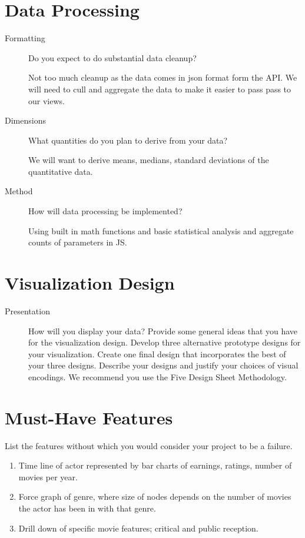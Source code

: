 \documentclass[12pt]{article}
\begin{document}
\section{Data Processing}
\begin{description}
    
    \item [Formatting] Do you expect to do substantial data cleanup?
        
        Not too much cleanup as the data comes in json format form the API. We will need to cull and aggregate the data to make it easier to pass pass to our views. 

    \item [Dimensions] What quantities do you plan to derive from your data?

        We will want to derive means, medians, standard deviations of the quantitative data.

    \item [Method] How will data processing be implemented?

        Using built in math functions and basic statistical analysis and aggregate counts of parameters in JS. 

\end{description}
  
  
\section{Visualization Design}
\begin{description}
\item [Presentation]  How will you display your data? Provide some general ideas that you have for the visualization design. Develop three alternative prototype designs for your visualization. Create one final design that incorporates the best of your three designs. Describe your designs and justify your choices of visual encodings. We recommend you use the Five Design Sheet Methodology.
\end{description}
  
\section{Must-Have Features}

List the features without which you would consider your project to be a failure.

\begin{enumerate}
 
 \item Time line of actor represented by bar charts of earnings, ratings, number of movies per year. 
 
 \item Force graph of genre, where size of nodes depends on the number of movies the actor has been in with that genre. 
 
 \item Drill down of specific movie features; critical and public reception. 

\end{enumerate}
\end{document}
